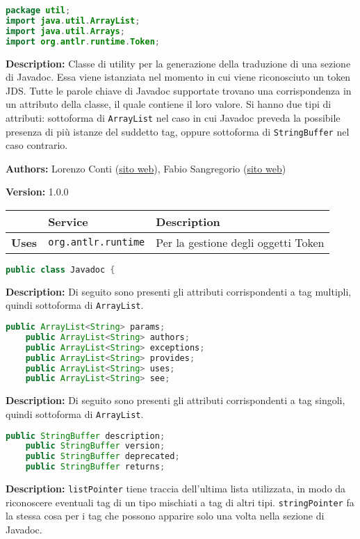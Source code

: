\begin{lstlisting}[language=Java]
package util;
import java.util.ArrayList;
import java.util.Arrays;
import org.antlr.runtime.Token;
\end{lstlisting}
\textbf{Description:}  Classe di utility per la generazione della traduzione di una sezione di Javadoc.  Essa viene istanziata nel momento in cui viene riconosciuto un token JDS. Tutte le parole chiave di Javadoc supportate trovano una corrispondenza in un attributo della classe, il quale contiene il loro valore. Si hanno due tipi di attributi: sottoforma di \texttt{ArrayList} nel caso in cui Javadoc preveda la possibile presenza di più istanze del suddetto tag, oppure sottoforma di \texttt{StringBuffer} nel caso contrario.  

\textbf{Authors:} Lorenzo Conti        (\href{https://www.lorenzoconti.dev}{sito web}), Fabio Sangregorio    (\href{https://fabio.sangregorio.dev}{sito web})

\textbf{Version:} 1.0.0

\begin{table}[!h]\centering
\begin{tabular}{|l|p{}|p{}|}
\hline & \textbf{Service} & \textbf{Description} \\ \hline
\multirow{1}{*}{\textbf{Uses}}
& \texttt{org.antlr.runtime} & Per la gestione degli oggetti Token \\
\hline
\end{tabular}\end{table}
\begin{lstlisting}[language=Java]
public class Javadoc {
\end{lstlisting}
\textbf{Description:}  Di seguito sono presenti gli attributi corrispondenti a tag multipli, quindi sottoforma di \texttt{ArrayList}.

\begin{lstlisting}[language=Java]
    public ArrayList<String> params;
    public ArrayList<String> authors;
    public ArrayList<String> exceptions;
    public ArrayList<String> provides;
    public ArrayList<String> uses;
    public ArrayList<String> see;
\end{lstlisting}
\textbf{Description:}  Di seguito sono presenti gli attributi corrispondenti a tag singoli, quindi sottoforma di \texttt{ArrayList}.

\begin{lstlisting}[language=Java]
    public StringBuffer description;
    public StringBuffer version;
    public StringBuffer deprecated;
    public StringBuffer returns;
\end{lstlisting}
\textbf{Description:}  \texttt{listPointer} tiene traccia dell'ultima lista utilizzata, in modo da riconoscere eventuali tag di un tipo mischiati a tag di altri tipi. \texttt{stringPointer} fa la stessa cosa per i tag che possono apparire solo una volta nella sezione di Javadoc.

